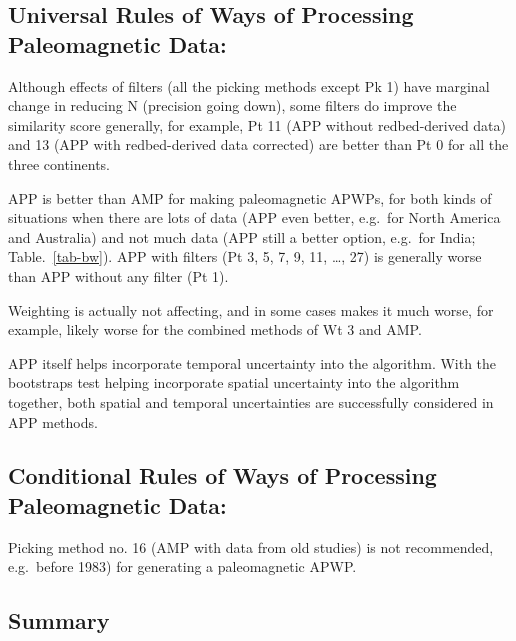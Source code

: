 \subsection{Universal Rules of Ways of Processing Paleomagnetic Data:}
%
\begin{description}
  \item Although effects of filters (all the picking methods except Pk 1) have
		marginal change in reducing N (precision going down), some filters do
		improve the similarity score generally, for example, Pt 11 (APP without
		redbed-derived data) and 13 (APP with redbed-derived data corrected) are
		better than Pt 0 for all the three continents.
  \item APP is better than AMP for making paleomagnetic APWPs, for both kinds
		of situations when there are lots of data (APP even better, e.g.\ for
		North America and Australia) and not much data (APP still a better
		option, e.g.\ for India; Table.~\ref{tab-bw}). APP with filters (Pt
		3, 5, 7, 9, 11, \ldots, 27) is generally worse than APP without any
		filter (Pt 1).
  \item Weighting is actually not affecting, and in some cases makes it much
		worse, for example, likely worse for the combined methods of Wt 3 and
		AMP.
  \item APP itself helps incorporate temporal uncertainty into the algorithm.
		With the bootstraps test helping incorporate spatial uncertainty into
		the algorithm together, both spatial and temporal uncertainties are
		successfully considered in APP methods.
\end{description}

\subsection{Conditional Rules of Ways of Processing Paleomagnetic Data:}
%
\begin{description}
  \item Picking method no. 16 (AMP with data from old studies) is not
		recommended, e.g.\ before 1983) for generating a paleomagnetic APWP.
\end{description}

\subsection{Summary}


